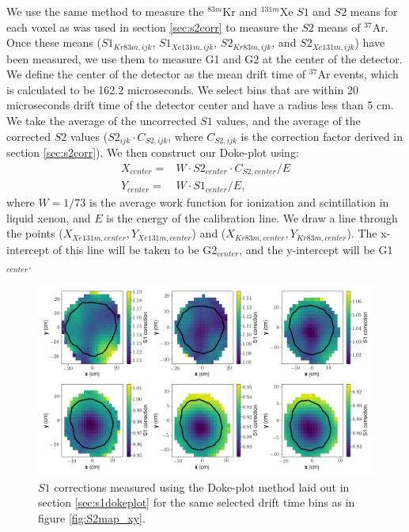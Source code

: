 {We use the same method to measure the $^{83m}$Kr and $^{131m}$Xe $S1$ and $S2$ means for each voxel as was used in section \ref{sec:s2corr} to measure the $S2$ means of $^{37}$Ar. Once these means ($S1_{Kr83m,ijk}$, $S1_{Xe131m,ijk}$, $S2_{Kr83m,ijk}$, and $S2_{Xe131m,ijk}$) have been measured, we use them to measure G1 and G2 at the center of the detector. We define the center of the detector as the mean drift time of $^{37}$Ar events, which is calculated to be 162.2 microseconds. We select bins that are within 20 microseconds drift time of the detector center and have a radius less than 5 cm. We take the average of the uncorrected $S1$ values, and the average of the corrected $S2$ values ($S2_{ijk}\cdot C_{S2,ijk}$, where $C_{S2,ijk}$ is the correction factor derived in section \ref{sec:s2corr}). We then construct our Doke-plot using:
\begin{equation}
\begin{split}
X_{center}=& W\cdot S2_{center}\cdot C_{S2,center}/E\\
Y_{center}=& W\cdot S1_{center}/E,
\end{split}
\end{equation}
where $W=1/73$ is the average work function for ionization and scintillation in liquid xenon, and $E$ is the energy of the calibration line. We draw a line through the points ($X_{Xe131m,center},Y_{Xe131m,center}$) and ($X_{Kr83m,center},Y_{Kr83m,center}$). The x-intercept of this line will be taken to be G2$_{center}$, and the y-intercept will be G1$_{center}$.
\begin{figure}[h!]
\centering
\includegraphics[width=150mm]{Figures/S1corr_xy.png}
\caption{$S1$ corrections measured using the Doke-plot method laid out in section \ref{sec:s1dokeplot} for the same selected drift time bins as in figure \ref{fig:S2map_xy}. }
\label{fig:S1corr_xy} 
\end{figure}


}
